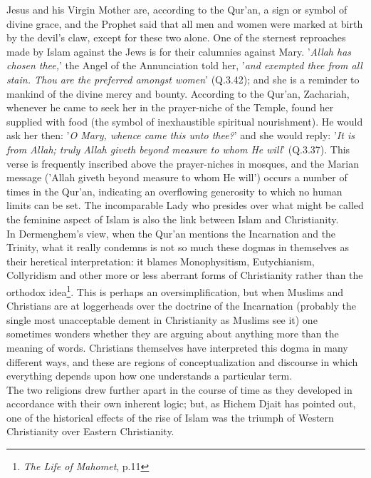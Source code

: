 \documentclass[11pt, b5paper, twoside]{book}
\begin{document}
Jesus and his Virgin Mother are, according to the Qur'an, a sign or symbol of divine grace, and the 
Prophet said that all men and women were marked at birth by the devil's claw, except for these two 
alone. One of the sternest reproaches made by Islam against the Jews is for their calumnies against 
Mary. '\emph{Allah has chosen thee,}' the Angel of the Annunciation told her, '\emph{and exempted thee from all stain. Thou are the preferred amongst women}' (Q.3.42); and she is a reminder to mankind of the divine mercy and bounty. According to the Qur'an, Zachariah, whenever he came to seek her in the prayer-niche of the Temple, found her supplied with food (the symbol of inexhaustible spiritual 
nourishment). He would ask her then: '\emph{O Mary, whence came this unto thee?}' and she would reply: '\emph{It is from Allah; truly Allah giveth beyond measure to whom He will}' (Q.3.37). This verse is frequently inscribed above the prayer-niches in mosques, and the Marian message ('Allah giveth beyond measure to whom He will') occurs a number of times in the Qur'an, indicating an overflowing generosity to which no human limits can be set. The incomparable Lady who presides over what might be called the feminine aspect of Islam is also the link between Islam and Christianity. \\

In Dermenghem's view, when the Qur'an mentions the Incarnation and the Trinity, what it really 
condemns is not so much these dogmas in themselves as their heretical interpretation: it blames 
Monophysitism, Eutychianism, Collyridism and other more or less aberrant forms of Christianity rather 
than the orthodox idea\footnote{\emph{The Life of Mahomet}, p.11}. This is perhaps an oversimplification, but when Muslims and Christians are at loggerheads over the doctrine of the Incarnation (probably the single most unacceptable dement in Christianity as Muslims see it) one sometimes wonders whether they are arguing about anything more than the meaning of words. Christians themselves have interpreted this dogma in many different ways, and these are regions of conceptualization and discourse in which everything depends upon how one understands a particular term. \\

The two religions drew further apart in the course of time as they developed in accordance with their 
own inherent logic; but, as Hichem Djait has pointed out, one of the historical effects of the rise 
of Islam was the triumph of Western Christianity over Eastern Christianity. \\
\end{document}
